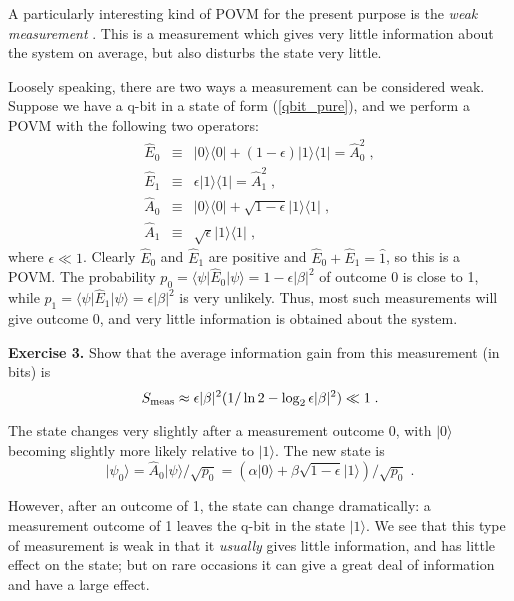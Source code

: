 \documentclass[12pt]{article}
\def\bra#1{{\langle #1 |}}
\def\ket#1{{| #1 \rangle}}
\def\id{{\hat 1}}
\def\E{{\hat E}}
\def\A{{\hat A}}
\begin{document}
A particularly interesting kind of POVM for the present purpose is the
{\it weak measurement} \cite{Vaidman}.
This is a measurement which gives very
little information about the system on average, but also disturbs the
state very little.

Loosely speaking, there are two ways a measurement can be
considered weak.  Suppose we have a q-bit in a state of form
(\ref{qbit_pure}), and we perform a POVM with the following two operators:
\begin{eqnarray}
\E_0 &\equiv& \ket0\bra0 + (1-\epsilon)\ket1\bra1
  = \A_0^2 \;, \nonumber\\ 
\E_1 &\equiv& \epsilon \ket1\bra1 = \A_1^2 \;, \nonumber\\
\A_0 &\equiv& \ket0\bra0 + \sqrt{1-\epsilon}\ket1\bra1
  \;, \nonumber\\ 
\A_1 &\equiv& \sqrt\epsilon \ket1\bra1 \;,
\label{weak1}
\end{eqnarray}
where $\epsilon \ll 1$.  Clearly $\E_0$ and $\E_1$ are positive and
$\E_0+\E_1=\id$, so this is a POVM.
The probability $p_0 = \bra\psi\E_0\ket\psi = 1-\epsilon|\beta|^2$
of outcome 0 is close to 1, while
$p_1 = \bra\psi\E_1\ket\psi = \epsilon|\beta|^2$ is
very unlikely.  Thus, most such measurements will give outcome 0, and very
little information is obtained about the system.

\medskip\noindent
{\bf Exercise 3.}  Show that the average information
gain from this measurement (in bits) is
\begin{equation}
S_{\rm meas} \approx  \epsilon|\beta|^2(1/\ln 2 - \log_2 \epsilon|\beta|^2)
  \ll 1 \;.
\end{equation}
\medskip

The state changes very slightly after a measurement outcome 0,
with $\ket0$ becoming slightly more likely relative to $\ket1$.
The new state is
\begin{equation}
\ket{\psi_0} = \A_0\ket\psi/\sqrt{p_0}
  = (\alpha\ket0 + \beta \sqrt{1-\epsilon}\ket1)/\sqrt{p_0} \;.
\end{equation}

However, after an outcome of 1, the state can change dramatically:  a
measurement outcome of 1 leaves the q-bit in the state $\ket1$.  We see
that this type of measurement is weak in that it {\it usually} gives little
information, and has little effect on the state; but on rare occasions it
can give a great deal of information and have a large effect.
\end{document}
